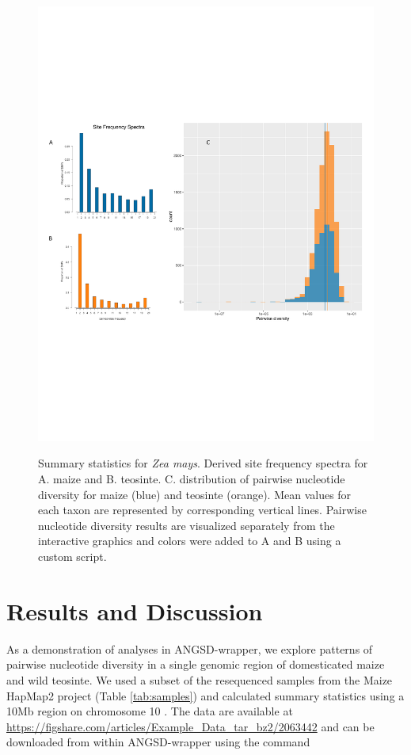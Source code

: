 \documentclass[10pt,a4paper]{article}
\begin{document}
\begin{figure}
\centering
\caption{Summary statistics for {\it Zea mays}. Derived site frequency spectra for A. maize and B. teosinte. C. distribution of pairwise nucleotide diversity for maize (blue) and teosinte (orange). Mean values for each taxon are represented by corresponding vertical lines. Pairwise nucleotide diversity results are visualized separately from the interactive graphics and colors were added to A and B using a custom script.}
\includegraphics[width=0.8\linewidth]{figures/figure3big.pdf}
\label{fig:figure3}
\end{figure}

\section*{Results and Discussion}
As a demonstration of analyses in ANGSD-wrapper, we explore patterns of pairwise nucleotide diversity in a single genomic region of domesticated maize and wild teosinte. 
We used a subset of the resequenced samples from the Maize HapMap2 project (Table \ref{tab:samples}) and calculated summary statistics using a 10Mb region on chromosome 10 \citep{chia2012maize}. 
The data are available at \url{https://figshare.com/articles/Example_Data_tar_bz2/2063442} and can be downloaded from within ANGSD-wrapper using the command 
\end{document}
